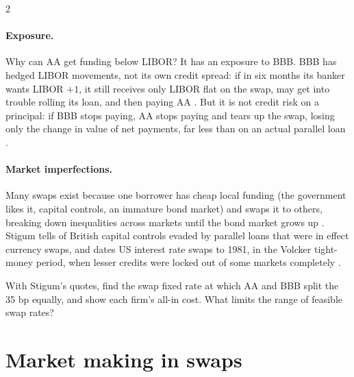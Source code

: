 \begin{paracol}{2}
\begin{nfigure}
\begin{taccts}
\qquad
{}
\end{taccts}
\caption{Stigum's swap as a notional parallel loan (in parentheses: not actual loans; only net payments are made) .}\label{fig:irs-parallel}
\end{nfigure}

\paragraph{Exposure.} Why can AA get funding below LIBOR? It has an exposure to BBB. BBB has hedged LIBOR movements, not its own credit spread: if in six months its
banker wants LIBOR $+1$, it still receives only LIBOR flat on the swap, may get into trouble rolling its loan, and then paying AA .
But it is not credit risk on a principal: if BBB stops paying, AA stops paying and tears up the swap, losing only the change in value of net payments, far less than
on an actual parallel loan .

\paragraph{Market imperfections.} Many swaps exist because one borrower has cheap local funding (the government likes it, capital controls, an immature bond market)
and swaps it to others, breaking down inequalities across markets until the bond market grows up . Stigum tells of British capital controls evaded by parallel loans that were
in effect currency swaps, and dates US interest rate swaps to 1981, in the Volcker tight-money period, when lesser credits were locked out of some markets completely .

\begin{exercise}
With Stigum's quotes, find the swap fixed rate at which AA and BBB split the 35 bp equally, and show each firm's all-in cost. What limits the range of feasible
swap rates?
\end{exercise}


\section{Market making in swaps}\label{sec:irs-dealers}


\end{paracol}
